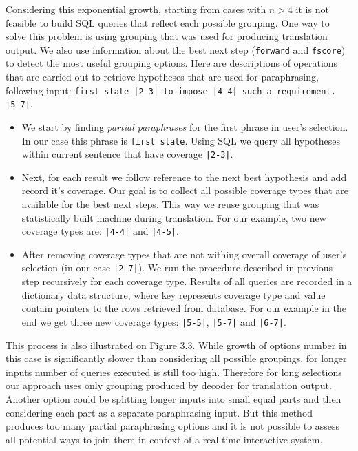 Considering this exponential growth, starting from cases with $n > 4$ it is not feasible to build SQL queries that reflect each possible grouping. One way to solve this problem is using grouping that was used for producing translation output. We also use information about the best next step (\texttt{forward} and \texttt{fscore}) to detect the most useful grouping options. Here are descriptions of operations that are carried out to retrieve hypotheses that are used for paraphrasing, following input: \texttt{first state |2-3| to impose |4-4| such a requirement. |5-7|}.

\begin{itemize}
    \item We start by finding \emph{partial paraphrases} for the first phrase in user's selection. In our case this phrase is \texttt{first state}. Using SQL we query all hypotheses within current sentence that have coverage \texttt{|2-3|}. 
    \item Next, for each result we follow reference to the next best hypothesis and add record it's coverage. Our goal is to collect all possible coverage types that are available for the best next steps. This way we reuse grouping that was statistically built machine during translation. For our example, two new coverage types are: \texttt{|4-4|} and \texttt{|4-5|}.
    \item After removing coverage types that are not withing overall coverage of user's selection (in our case \texttt{|2-7|}). We run the procedure described in previous step recursively for each coverage type. Results of all queries are recorded in a dictionary data structure, where key represents coverage type and value contain pointers to the rows retrieved from database. For our example in the end we get three new coverage types: \texttt{|5-5|}, \texttt{|5-7|} and \texttt{|6-7|}. 
\end{itemize}

This process is also illustrated on Figure 3.3. While growth of options number in this case is significantly slower than considering all possible groupings, for longer inputs number of queries executed is still too high. Therefore for long selections our approach uses only grouping produced by decoder for translation output. Another option could be splitting longer inputs into small equal parts and then considering each part as a separate paraphrasing input. But this method produces too many partial paraphrasing options and it is not possible to assess all potential ways to join them in context of a real-time interactive system. 
 
